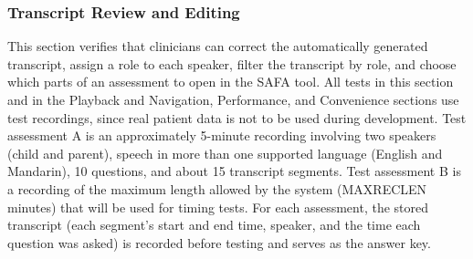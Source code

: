 \documentclass[12pt, titlepage]{article}
\renewcommand{\_}{\oldunderscore\allowbreak}
\begin{document}
\subsubsection{Transcript Review and Editing} \label{sec:TranscriptTests}
This section verifies that clinicians can correct the automatically generated transcript, assign a role to each speaker, filter the transcript by role, and choose which parts of an assessment to open in the SAFA tool.
All tests in this section and in the Playback and Navigation, Performance, and Convenience sections use test recordings, since real patient data is not to be used during development.
Test assessment A is an approximately 5-minute recording involving two speakers (child and parent), speech in more than one supported language (English and Mandarin), 10 questions, and about 15 transcript segments.
Test assessment B is a recording of the maximum length allowed by the system (MAX\_REC\_LEN minutes) that will be used for timing tests.
For each assessment, the stored transcript (each segment's start and end time, speaker, and the time each question was asked) is recorded before testing and serves as the answer key.
\end{document}
